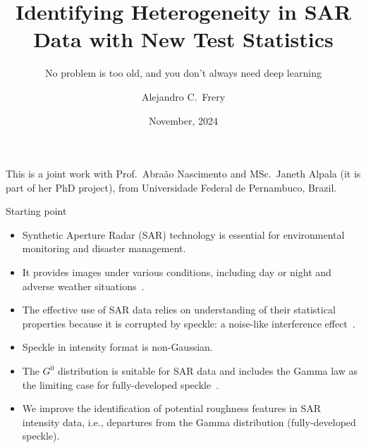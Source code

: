 \documentclass[table,aspectratio=169]{beamer}
\title{Identifying Heterogeneity in SAR Data with New Test Statistics}
\subtitle{No problem is too old, and you don't always need deep learning}
\author{Alejandro C.\ Frery}
\institute{Victoria University of Wellington\\
School of Mathematics and Statistics\\
New Zealand}
\date{November, 2024}
\begin{document}
\setsansfont[BoldFont={Avenir Heavy}]{Avenir Book}

\frame{\titlepage}

\begin{frame}
This is a joint work with Prof.\ Abraão Nascimento and MSc.\ Janeth Alpala (it is part of her PhD project), from Universidade Federal de Pernambuco, Brazil.
\end{frame}

\begin{frame}{Starting point}
\begin{itemize}[<+->]
	\item Synthetic Aperture Radar (SAR) technology is essential for environmental monitoring and disaster management. 
	\item It provides
	images under various conditions, including day or night and adverse weather
	situations~\citep{Moreira2013,Mu2019}. 
	\item The effective use of SAR
	data relies on understanding of their statistical properties
	because it is corrupted by speckle: a noise-like interference effect~\citep{Argenti2013}.
	\item Speckle in intensity format is non-Gaussian. 
	\item The
	\({G}^0\) distribution is suitable for SAR data and includes
	the Gamma law as the limiting case for fully-developed
	speckle~\citep{Ferreira2020}.
	\item We improve the identification of potential roughness
	features in SAR intensity data, i.e., departures from the Gamma distribution (fully-developed
	speckle).
\end{itemize}
\end{frame}

\end{document}
